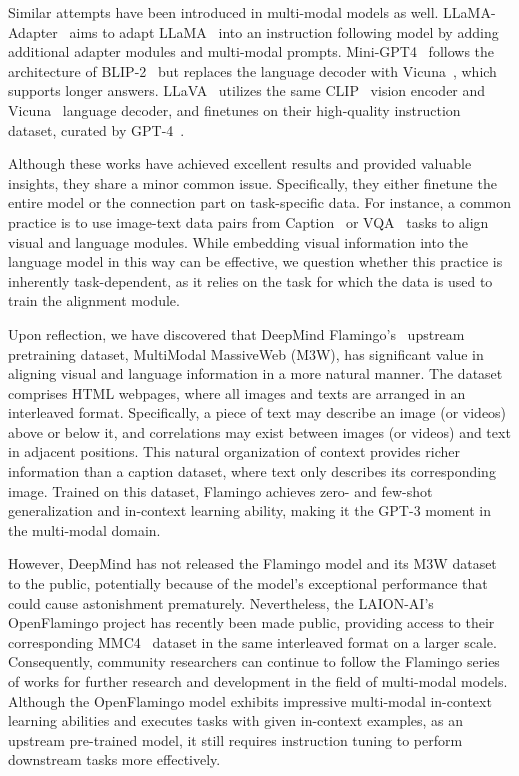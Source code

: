 \documentclass{article}
\begin{document}
Similar attempts have been introduced in multi-modal models as well. LLaMA-Adapter~\cite{llama_adapater} aims to adapt LLaMA~\cite{llama} into an instruction following model by adding additional adapter modules and multi-modal prompts. Mini-GPT4~\cite{mini_gpt4} follows the architecture of BLIP-2~\cite{li2023blip} but replaces the language decoder with Vicuna~\cite{vicuna2023}, which supports longer answers. LLaVA~\cite{llava} utilizes the same CLIP~\cite{radford2021learning} vision encoder and Vicuna~\cite{vicuna2023} language decoder, and finetunes on their high-quality instruction dataset, curated by GPT-4~\cite{gpt4}.

Although these works have achieved excellent results and provided valuable insights, they share a minor common issue. Specifically, they either finetune the entire model or the connection part on task-specific data. For instance, a common practice is to use image-text data pairs from Caption~\cite{coco} or VQA~\cite{goyal2017making} tasks to align visual and language modules. While embedding visual information into the language model in this way can be effective, we question whether this practice is inherently task-dependent, as it relies on the task for which the data is used to train the alignment module.

Upon reflection, we have discovered that DeepMind Flamingo's~\cite{flamingo} upstream pretraining dataset, MultiModal MassiveWeb (M3W), has significant value in aligning visual and language information in a more natural manner. The dataset comprises HTML webpages, where all images and texts are arranged in an interleaved format. Specifically, a piece of text may describe an image (or videos) above or below it, and correlations may exist between images (or videos) and text in adjacent positions. This natural organization of context provides richer information than a caption dataset, where text only describes its corresponding image. Trained on this dataset, Flamingo achieves zero- and few-shot generalization and in-context learning ability, making it the GPT-3 moment in the multi-modal domain.

However, DeepMind has not released the Flamingo model and its M3W dataset to the public, potentially because of the model's exceptional performance that could cause astonishment prematurely. Nevertheless, the LAION-AI's OpenFlamingo project \cite{open_flamingo} has recently been made public, providing access to their corresponding MMC4~\cite{zhu2023multimodal} dataset in the same interleaved format on a larger scale. Consequently, community researchers can continue to follow the Flamingo series of works for further research and development in the field of multi-modal models. Although the OpenFlamingo model exhibits impressive multi-modal in-context learning abilities and executes tasks with given in-context examples, as an upstream pre-trained model, it still requires instruction tuning to perform downstream tasks more effectively. 
\end{document}
